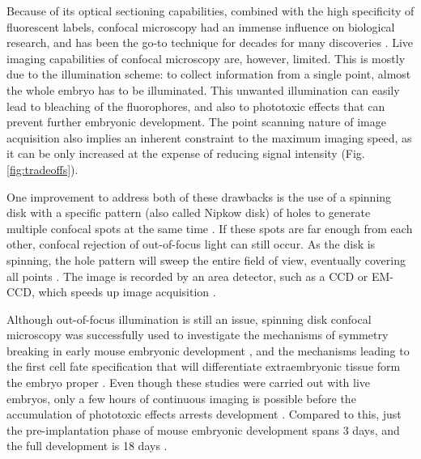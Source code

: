   Because of its optical sectioning capabilities, combined with the high specificity of fluorescent labels, confocal microscopy had an immense influence on biological research, and has been the go-to technique for decades for many discoveries \cite{shotton_confocal_1989,graf_live_2005,jonkman_any_2015}.
  Live imaging capabilities of confocal microscopy are, however, limited. This is mostly due to the illumination scheme: to collect information from a single point, almost the whole embryo has to be illuminated. This unwanted illumination can easily lead to bleaching of the fluorophores, and also to phototoxic effects that can prevent further embryonic development. The point scanning nature of image acquisition also implies an inherent constraint to the maximum imaging speed, as it can be only increased at the expense of reducing signal intensity (Fig. \ref{fig:tradeoffs}).

  One improvement to address both of these drawbacks is the use of a spinning disk with a specific pattern (also called Nipkow disk) of holes to generate multiple confocal spots at the same time \cite{graf_live_2005}. If these spots are far enough from each other, confocal rejection of out-of-focus light can still occur. As the disk is spinning, the hole pattern will sweep the entire field of view, eventually covering all points \cite{kino_intermediate_1990}. The image is recorded by an area detector, such as a CCD or EM-CCD, which speeds up image acquisition \cite{nakano_spinning-disk_2002}.

  Although out-of-focus illumination is still an issue, spinning disk confocal microscopy was successfully used to investigate the mechanisms of symmetry breaking in early mouse embryonic development \cite{korotkevich_apical_2017}, and the mechanisms leading to the first cell fate specification that will differentiate extraembryonic tissue form the embryo proper \cite{maitre_pulsatile_2015,dietrich_venus_2015,maitre_asymmetric_2016}. Even though these studies were carried out with live embryos, only a few hours of continuous imaging is possible before the accumulation of phototoxic effects arrests development \cite{nowotschin_chapter_2010}. Compared to this, just the pre-implantation phase of mouse embryonic development spans 3 days, and the full development is 18 days \cite{wolpert_principles_2011}.


